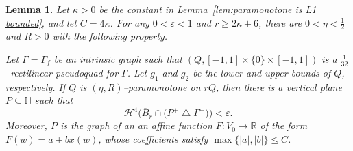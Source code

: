 \documentclass[11pt,reqno]{amsart}
\renewcommand{\H}{\mathbb{H}}
\newcommand{\R}{\mathbb{R}}
\newcommand{\cH}{\mathcal{H}}
\renewcommand{\epsilon}{\varepsilon}
\newcommand{\0}{\mathbf{0}}
\renewcommand{\1}{\mathbf 1}
\newcommand{\from}{\colon}
\newcommand{\symdiff}{\mathbin{\triangle}}
\renewcommand{\subset}{\subseteq}
\renewcommand{\ge}{\geqslant}
\renewcommand{\le}{\leqslant}
\newtheorem{lemma}[thm]{Lemma}
\theoremstyle{remark}
\begin{document}
\begin{lemma}\label{lem:paramonotone approximate plane small} %
  Let $\kappa>0$ be the constant in Lemma~\ref{lem:paramonotone is L1 bounded}, and let $C=4\kappa$.  For any $0<\epsilon<1$ and $r \ge 2 \kappa + 6$, there are $0<\eta<\frac{1}{2}$ and $R>0$ with the following property.

  Let $\Gamma=\Gamma_f$ be an intrinsic graph such that $(Q, [-1,1]\times \{0\}\times [-1,1])$ is a $\frac{1}{32}$--rectilinear pseudoquad for $\Gamma$.  Let $g_1$ and $g_2$ be the lower and upper bounds of $Q$, respectively.  If $Q$ is $(\eta, R)$--paramonotone on $r Q$, then there is a vertical plane $P\subset \H$ such that
  \begin{equation}\label{eq:plane symdiff close}
    \cH^4\Big(\overline{B}_{r}\cap \big(P^+\symdiff \Gamma^+\big)\Big)<\epsilon.
  \end{equation}
  Moreover, $P$ is the graph of an an affine function $F\from V_0\to \R$ of the form $F(w)=a+bx(w)$, whose coefficients satisfy $\max \{|a|,|b|\}\le C$.
\end{lemma}
\end{document}
